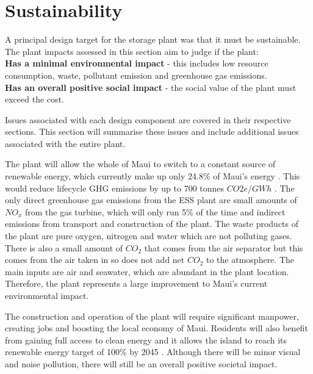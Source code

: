\documentclass[11pt, oneside]{article}
\begin{document}
\section{Sustainability}

A principal design target for the storage plant was that it must be sustainable. The plant impacts assessed in this section aim to judge if the plant:
\\ \textbf{Has a minimal environmental impact} - this includes low resource consumption, waste, pollutant emission and greenhouse gas emissions.
\\ \textbf{Has an overall positive social impact} - the social value of the plant must exceed the cost.

Issues associated with each design component are covered in their respective sections. This section will summarise these issues and include additional issues associated with the entire plant.

The plant will allow the whole of Maui to switch to a constant source of renewable energy, which currently make up only 24.8\% of Maui's energy \cite{website:mauielectric}. This would reduce lifecycle GHG emissions by up to 700 tonnes $CO2e/GWh$ \cite{GHG}. The only direct greenhouse gas emissions from the ESS plant are small amounts of $NO_x$ from the gas turbine, which will only run 5\% of the time and indirect emissions from transport and construction of the plant. The waste products of the plant are pure oxygen, nitrogen and water which are not polluting gases. There is also a small amount of $CO_2$ that comes from the air separator but this comes from the air taken in so does not add net $CO_2$ to the atmosphere. The main inputs are air and seawater, which are abundant in the plant location. Therefore, the plant represents a large improvement to Maui's current environmental impact.

The construction and operation of the plant will require significant manpower, creating jobs and boosting the local economy of Maui. Residents will also benefit from gaining full access to clean energy and it allows the island to reach its renewable energy target of 100\% by 2045 \cite{website:hcei}. Although there will be minor visual and noise pollution, there will still be an overall positive societal impact.



\end{document}
